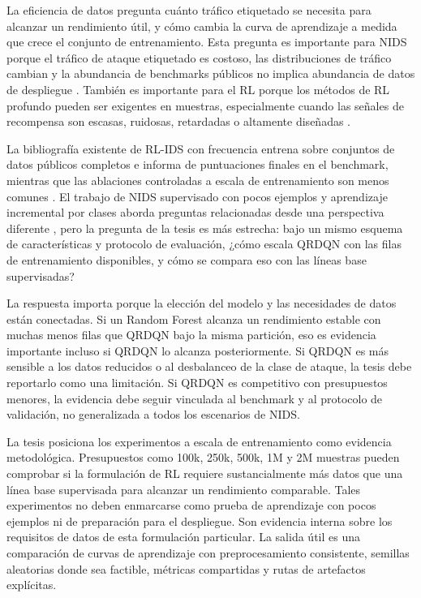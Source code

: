 La eficiencia de datos pregunta cuánto tráfico etiquetado se necesita para alcanzar un rendimiento útil, y cómo cambia la curva de aprendizaje a medida que crece el conjunto de entrenamiento. Esta pregunta es importante para NIDS porque el tráfico de ataque etiquetado es costoso, las distribuciones de tráfico cambian y la abundancia de benchmarks públicos no implica abundancia de datos de despliegue \parencite{Ring2019DatasetSurvey,Apruzzese2022CrossEvaluationNIDS}. También es importante para el RL porque los métodos de RL profundo pueden ser exigentes en muestras, especialmente cuando las señales de recompensa son escasas, ruidosas, retardadas o altamente diseñadas \parencite{SuttonBarto2018RL,Hessel2018Rainbow}.

La bibliografía existente de RL-IDS con frecuencia entrena sobre conjuntos de datos públicos completos e informa de puntuaciones finales en el benchmark, mientras que las ablaciones controladas a escala de entrenamiento son menos comunes \parencite{Yang2024DRLNIDSSurvey,Kheddar2025RLIDSReview}. El trabajo de NIDS supervisado con pocos ejemplos y aprendizaje incremental por clases aborda preguntas relacionadas desde una perspectiva diferente \parencite{DiMonda2024FewShotNIDS}, pero la pregunta de la tesis es más estrecha: bajo un mismo esquema de características y protocolo de evaluación, ¿cómo escala QRDQN con las filas de entrenamiento disponibles, y cómo se compara eso con las líneas base supervisadas?

La respuesta importa porque la elección del modelo y las necesidades de datos están conectadas. Si un Random Forest alcanza un rendimiento estable con muchas menos filas que QRDQN bajo la misma partición, eso es evidencia importante incluso si QRDQN lo alcanza posteriormente. Si QRDQN es más sensible a los datos reducidos o al desbalanceo de la clase de ataque, la tesis debe reportarlo como una limitación. Si QRDQN es competitivo con presupuestos menores, la evidencia debe seguir vinculada al benchmark y al protocolo de validación, no generalizada a todos los escenarios de NIDS.

La tesis posiciona los experimentos a escala de entrenamiento como evidencia metodológica. Presupuestos como 100k, 250k, 500k, 1M y 2M muestras pueden comprobar si la formulación de RL requiere sustancialmente más datos que una línea base supervisada para alcanzar un rendimiento comparable. Tales experimentos no deben enmarcarse como prueba de aprendizaje con pocos ejemplos ni de preparación para el despliegue. Son evidencia interna sobre los requisitos de datos de esta formulación particular. La salida útil es una comparación de curvas de aprendizaje con preprocesamiento consistente, semillas aleatorias donde sea factible, métricas compartidas y rutas de artefactos explícitas.

